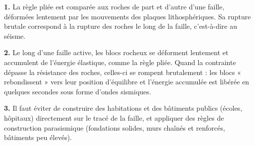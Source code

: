 \documentclass[11pt]{article}
\begin{document}
\begin{corrige}
\textbf{1.} La règle pliée est comparée aux roches de part et d'autre d'une faille, déformées lentement par les mouvements des plaques lithosphériques. Sa rupture brutale correspond à la rupture des roches le long de la faille, c'est-à-dire au séisme.

\textbf{2.} Le long d'une faille active, les blocs rocheux se déforment lentement et accumulent de l'énergie élastique, comme la règle pliée. Quand la contrainte dépasse la résistance des roches, celles-ci se rompent brutalement : les blocs « rebondissent » vers leur position d'équilibre et l'énergie accumulée est libérée en quelques secondes sous forme d'ondes sismiques.

\textbf{3.} Il faut éviter de construire des habitations et des bâtiments publics (écoles, hôpitaux) directement sur le tracé de la faille, et appliquer des règles de construction parasismique (fondations solides, murs chaînés et renforcés, bâtiments peu élevés).
\end{corrige}
\end{document}
